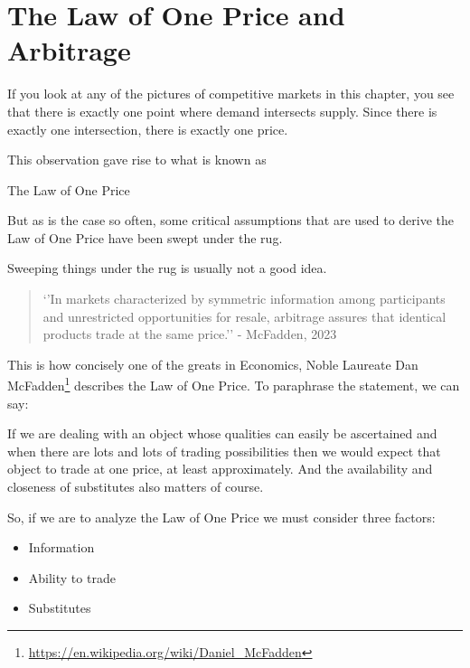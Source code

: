 \documentclass[
]{book}
\begin{document}
\hypertarget{the-law-of-one-price-and-arbitrage}{%
\section{The Law of One Price and Arbitrage}\label{the-law-of-one-price-and-arbitrage}}

If you look at any of the pictures of competitive markets in this chapter, you see that there is
exactly one point where demand intersects supply. Since there is exactly one intersection, there
is exactly one price.

This observation gave rise to what is known as

\begin{center}
The Law of One Price

\end{center}

But as is the case so often, some critical assumptions that are used to derive the Law of One Price have been swept under the rug.

Sweeping things under the rug is usually not a good idea.

\begin{center}

\begin{quote}
`'In markets characterized by symmetric information among participants and unrestricted
opportunities for resale, arbitrage assures that identical products trade at the same price.'' - McFadden, 2023
\end{quote}

\end{center}

This is how concisely one of the greats in Economics, Noble Laureate Dan McFadden\footnote{
  \url{https://en.wikipedia.org/wiki/Daniel_McFadden}} describes the Law of One Price. To paraphrase
the statement, we can say:

If we are dealing with an object whose qualities can easily be ascertained and when there are lots and lots of trading possibilities then we would expect that object to trade at one price, at least approximately. And the availability and closeness of substitutes also matters of course.

So, if we are to analyze the Law of One Price we must consider three factors:

\begin{itemize}
\item
  Information
\item
  Ability to trade
\item
  Substitutes
\end{itemize}
\end{document}
